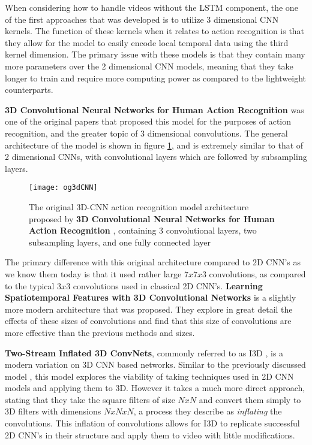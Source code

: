 When considering how to handle videos without the LSTM component, the one of the first approaches that was developed is to utilize 3 dimensional CNN kernels. The function of these kernels when it relates to action recognition is that they allow for the model to easily encode local temporal data using the third kernel dimension. The primary issue with these models is that they contain many more parameters over the 2 dimensional CNN models, meaning that they take longer to train and require more computing power as compared to the lightweight counterparts.

\textbf{3D Convolutional Neural Networks for Human Action Recognition} \cite{3DCNN-ActionRecognition} was one of the original papers that proposed this model for the purposes of action recognition, and the greater topic of 3 dimensional convolutions. The general architecture of the model is shown in figure \ref{fig:original3dcnn}, and is extremely similar to that of 2 dimensional CNNs, with convolutional layers which are followed by subsampling layers.

\begin{figure}[ht]
	\texttt{[image: og3dCNN]}
	\centering
	\caption{The original 3D-CNN action recognition model architecture proposed by \textbf{3D Convolutional Neural Networks for Human Action Recognition} \cite{3DCNN-ActionRecognition}, containing 3 convolutional layers, two subsampling layers, and one fully connected layer}
	\label{fig:original3dcnn}
\end{figure}

The primary difference with this original architecture compared to 2D CNN's as we know them today is that it used rather large $7x7x3$ convolutions, as compared to the typical $3x3$ convolutions used in classical 2D CNN's. \textbf{Learning Spatiotemporal Features with 3D Convolutional Networks} \cite{3x33dcnn} is a slightly more modern architecture that was proposed. They explore in great detail the effects of these sizes of convolutions and find that this size of convolutions are more effective than the previous methods and sizes.

\textbf{Two-Stream Inflated 3D ConvNets}, commonly referred to as I3D \cite{i3d}, is a modern variation on 3D CNN based networks. Similar to the previously discussed model \cite{3DCNN-ActionRecognition}, this model explores the viability of taking techniques used in 2D CNN models and applying them to 3D. However it takes a much more direct approach, stating that they take the square filters of size $NxN$ and convert them simply to 3D filters with dimensions $NxNxN$, a process they describe as \textit{inflating} the convolutions. This inflation of convolutions allows for I3D to replicate successful 2D CNN's in their structure and apply them to video with little modifications.

